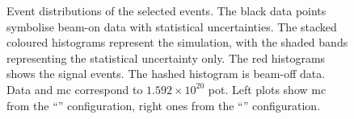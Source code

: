 \begin{figure}[]
{   \label{fig:trklen_tune1}} \quad
{} \quad
\caption[Distribution of Selected Events ($p_\mu$, $\cos\theta_\mu$, $l$)]{Event distributions of the selected events. The black data points symbolise beam-on data with statistical uncertainties. The stacked coloured histograms represent the simulation, with the shaded bands representing the statistical uncertainty only. The red histograms shows the signal events. The hashed histogram is beam-off data. Data and \acrshort{mc} correspond to $1.592 \times 10^{20}$ \acrshort{pot}. Left plots show \acrshort{mc} from the ``\tuneone'' configuration, right ones from the ``\tunethree'' configuration.}
\label{fig:final_dist}
\end{figure}
%
